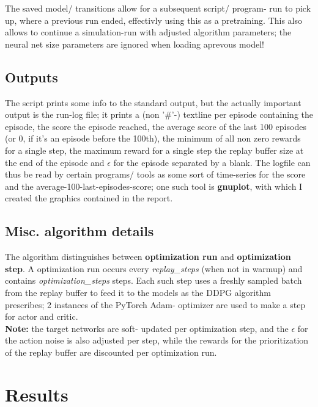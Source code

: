 \documentclass[a4paper]{article}
\begin{document}
The saved model/ transitions allow for a subsequent script/ program- run to
pick up, where a previous run ended, effectivly using this as a pretraining.
This also allows to continue a simulation-run with adjusted algorithm parameters;
the neural net size parameters are ignored when loading aprevous model!

\subsection{Outputs}

The script prints some info to the standard output, but the actually important
output is the run-log file; it prints a (non '\#'-) textline per episode containing
the episode, the score the episode reached, the average score of the last 100
episodes (or 0, if it's an episode before the 100th), the minimum of all
non zero rewards for a single step, the maximum reward for a single step
the replay buffer size at the end of the episode and $\epsilon$ for the episode
separated by a blank.
The logfile can thus be read by certain programs/ tools as some sort
of time-series for the score and the average-100-last-episodes-score; one such
tool is \textbf{gnuplot}, with which I created the graphics contained in the report.

\subsection{Misc. algorithm details}
The algorithm distinguishes between \textbf{optimization run} and \textbf{optimization step}.
A optimization run occurs every \textit{replay\_steps} (when not in warmup) and
contains \textit{optimization\_steps} steps. Each such step uses a freshly sampled
batch from the replay buffer to feed it to the models as the DDPG algorithm
prescribes; 2 instances of the PyTorch Adam- optimizer are used to make a step
for actor and critic.
\\
\textbf{Note:} the target networks are soft- updated per optimization step,
and the $\epsilon$ for the action noise is also adjusted per step, while
the rewards for the prioritization of the replay buffer are discounted per
optimization run.

\section{Results}
\end{document}

